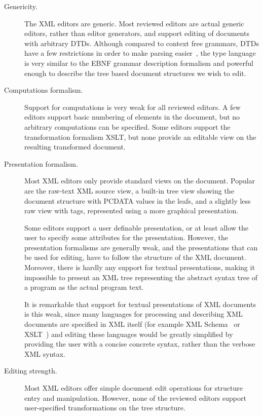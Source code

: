 \begin{description}
\item[Genericity.] 
The XML editors are generic. Most reviewed editors are actual generic editors, rather than editor generators, and support editing of documents with arbitrary DTDs. Although compared to context free grammars, DTDs have a few restrictions in order to make parsing easier~\cite{klein98glushkovRestr}, the type language is very similar to the EBNF grammar description formalism and powerful enough to describe the tree based document structures we wish to edit.

\item[Computations formalism.]
Support for computations is very weak for all reviewed editors. A few editors support basic numbering of elements in the document, but no arbitrary computations can be specified. Some editors support the transformation formalism XSLT, but none provide an editable view on the resulting transformed document.

\item[Presentation formalism.]
Most XML editors only provide standard views on the document. Popular are the raw-text XML source view, a built-in tree view showing the document structure with PCDATA values in the leafs, and a slightly less raw view with tags, represented using a more graphical presentation.

Some editors support a user definable presentation, or at least allow the user to specify some attributes for the presentation. However, the presentation formalisms are generally weak, and the presentations that can be used for editing, have to follow the structure of the XML document. Moreover, there is hardly any support for textual presentations, making it impossible to present an XML tree representing the abstract syntax tree of a program as the actual program text.

It is remarkable that support for textual presentations of XML documents is this weak, since many languages for processing and describing XML documents are specified in XML itself (for example XML Schema~\cite{xmlSchema1, xmlSchema2}  or XSLT~\cite{xslt10}) and editing these languages would be greatly simplified by providing the user with a concise concrete syntax, rather than the verbose XML syntax.

\item[Editing strength.]
Most XML editors offer simple document edit operations for structure entry and manipulation. However, none of the reviewed editors support user-specified transformations on the tree structure.


\end{description}
